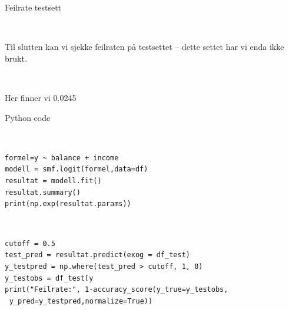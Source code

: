 \documentclass[10pt,ignorenonframetext,]{beamer}
\begin{document}
\begin{frame}

\begin{block}{Feilrate testsett}

\(~\)

Til slutten kan vi sjekke feilraten på testsettet -- dette settet har vi
enda ikke brukt.

\(~\)

Her finner vi 0.0245

\end{block}

\end{frame}

\begin{frame}[fragile]

\begin{block}{Python code}

\(~\)

\texttt{formel=\textquotesingle{}y\ \textasciitilde{}\ balance\ +\ income\textquotesingle{}}\\
\texttt{modell\ =\ smf.logit(formel,data=df)}~\\
\texttt{resultat\ =\ modell.fit()}~\\
\texttt{resultat.summary()}~\\
\texttt{print(np.exp(resultat.params))}

\(~\)

\texttt{cutoff\ =\ 0.5}\\
\texttt{test\_pred\ =\ resultat.predict(exog\ =\ df\_test)}~\\
\texttt{y\_testpred\ =\ np.where(test\_pred\ \textgreater{}\ cutoff,\ 1,\ 0)}~\\
\texttt{y\_testobs\ =\ df\_test{[}\textquotesingle{}y\textquotesingle{}{]}}~\\
\texttt{print("Feilrate:",\ 1-accuracy\_score(y\_true=y\_testobs,}~\\
\(~\) \texttt{y\_pred=y\_testpred,normalize=True))}

\end{block}

\end{frame}
\end{document}
